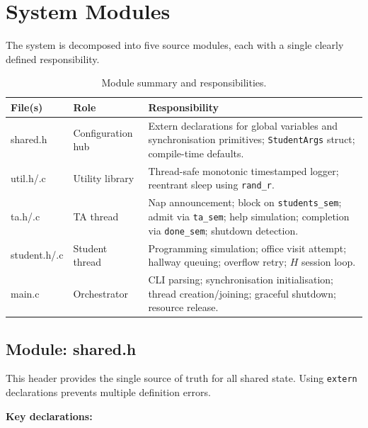 \documentclass[12pt,a4paper]{report}
\begin{document}
\chapter{System Modules}

The system is decomposed into five source modules, each with a single clearly defined
responsibility.

\begin{table}[H]
  \centering
  \caption{Module summary and responsibilities.}
  \label{tab:modules}
  \begin{tabularx}{\textwidth}{>{\ttfamily}l l X}
    \toprule
    \normalfont\textbf{File(s)} & \textbf{Role} & \textbf{Responsibility} \\
    \midrule
    shared.h      & Configuration hub  & Extern declarations for global variables and synchronisation primitives; \texttt{StudentArgs} struct; compile-time defaults. \\
    util.h/.c     & Utility library    & Thread-safe monotonic timestamped logger; reentrant sleep using \texttt{rand\_r}. \\
    ta.h/.c       & TA thread          & Nap announcement; block on \texttt{students\_sem}; admit via \texttt{ta\_sem}; help simulation; completion via \texttt{done\_sem}; shutdown detection. \\
    student.h/.c  & Student thread     & Programming simulation; office visit attempt; hallway queuing; overflow retry; $H$ session loop. \\
    main.c        & Orchestrator       & CLI parsing; synchronisation initialisation; thread creation/joining; graceful shutdown; resource release. \\
    \bottomrule
  \end{tabularx}
\end{table}

\section{Module: shared.h}

This header provides the single source of truth for all shared state. Using \texttt{extern}
declarations prevents multiple definition errors.

\textbf{Key declarations:}
\end{document}
